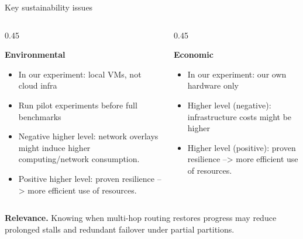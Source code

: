 \documentclass[aspectratio=169,11pt]{beamer}
\begin{document}
\begin{frame}{Key sustainability issues}
  \begin{columns}[T,onlytextwidth]
    \begin{column}{0.45\textwidth}
      {\footnotesize
      \textbf{Environmental}\\[0.3em]
      \begin{itemize}\itemsep0.25em
        \item In our experiment: local VMs, not cloud infra
        \item Run pilot experiments before full benchmarks
        \item Negative higher level: network overlays might induce higher computing/network consumption.
        \item Positive higher level: proven resilience --> more efficient use of resources.
      \end{itemize}}
    \end{column}
    \begin{column}{0.45\textwidth}
      {\footnotesize
      \textbf{Economic}\\[0.3em]
      \begin{itemize}\itemsep0.25em
        \item In our experiment: our own hardware only
        \item Higher level (negative): infrastructure costs might be higher
        \item Higher level (positive): proven resilience --> more efficient use of resources.
      \end{itemize}}
    \end{column}
  \end{columns}

  \vspace{0.9em}
  {\footnotesize
  \textbf{Relevance.}
  Knowing when multi-hop routing restores progress may reduce prolonged stalls
  and redundant failover under partial partitions.}
\end{frame}
\end{document}
